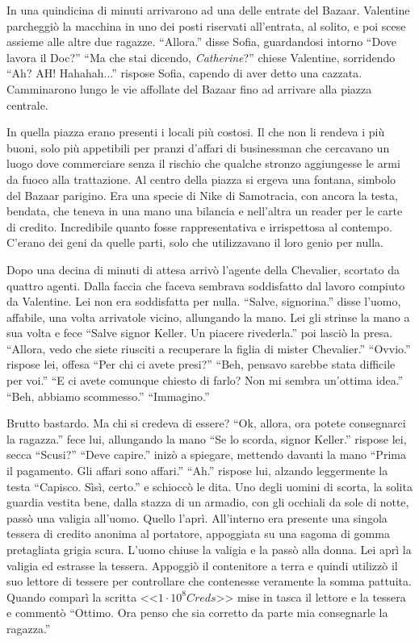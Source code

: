     In una quindicina di minuti arrivarono ad una delle entrate del Bazaar. Valentine parcheggiò la macchina in uno dei
    posti riservati all'entrata, al solito, e poi scese assieme alle altre due ragazze. ``Allora.'' disse Sofia,
    guardandosi intorno ``Dove lavora il Doc?'' ``Ma che stai dicendo, \emph{Catherine}?'' chiese Valentine, sorridendo
    ``Ah? AH! Hahahah...'' rispose Sofia, capendo di aver detto una cazzata. Camminarono lungo le vie affollate del
    Bazaar fino ad arrivare alla piazza centrale.

    In quella piazza erano presenti i locali più costosi. Il che non li rendeva i più buoni, solo più appetibili per
    pranzi d'affari di businessman che cercavano un luogo dove commerciare senza il rischio che qualche stronzo
    aggiungesse le armi da fuoco alla trattazione. Al centro della piazza si ergeva una fontana, simbolo del Bazaar
    parigino. Era una specie di Nike di Samotracia, con ancora la testa, bendata, che teneva in una mano una bilancia e
    nell'altra un reader per le carte di credito. Incredibile quanto fosse rappresentativa e irrispettosa al contempo.
    C'erano dei geni da quelle parti, solo che utilizzavano il loro genio per nulla.

    Dopo una decina di minuti di attesa arrivò l'agente della Chevalier, scortato da quattro agenti. Dalla faccia che
    faceva sembrava soddisfatto dal lavoro compiuto da Valentine. Lei non era soddisfatta per nulla. ``Salve,
    signorina.'' disse l'uomo, affabile, una volta arrivatole vicino, allungando la mano. Lei gli strinse la mano a sua
    volta e fece ``Salve signor Keller. Un piacere rivederla.'' poi lasciò la presa. ``Allora, vedo che siete riusciti a
    recuperare la figlia di mister Chevalier.'' ``Ovvio.'' rispose lei, offesa ``Per chi ci avete presi?'' ``Beh,
    pensavo sarebbe stata difficile per voi.'' ``E ci avete comunque chiesto di farlo? Non mi sembra un'ottima idea.''
    ``Beh, abbiamo scommesso.'' ``Immagino.''

    Brutto bastardo. Ma chi si credeva di essere? ``Ok, allora, ora potete consegnarci la ragazza.'' fece lui,
    allungando la mano ``Se lo scorda, signor Keller.'' rispose lei, secca ``Scusi?'' ``Deve capire.'' inizò a
    spiegare, mettendo davanti la mano ``Prima il pagamento. Gli affari sono affari.'' ``Ah.'' rispose lui, alzando
    leggermente la testa ``Capisco. Sìsì, certo.'' e schioccò le dita. Uno degli uomini di scorta, la solita guardia
    vestita bene, dalla stazza di un armadio, con gli occhiali da sole di notte, passò una valigia all'uomo. Quello
    l'aprì. All'interno era presente una singola tessera di credito anonima al portatore, appoggiata su una sagoma di
    gomma pretagliata grigia scura. L'uomo chiuse la valigia e la passò alla donna. Lei aprì la valigia ed estrasse la
    tessera. Appoggiò il contenitore a terra e quindi utilizzò il suo lettore di tessere per controllare che contenesse
    veramente la somma pattuita. Quando comparì la scritta <<$1 \cdot{} 10^8 Creds$>> mise in tasca il lettore e la
    tessera e commentò ``Ottimo. Ora penso che sia corretto da parte mia consegnarle la ragazza.''

